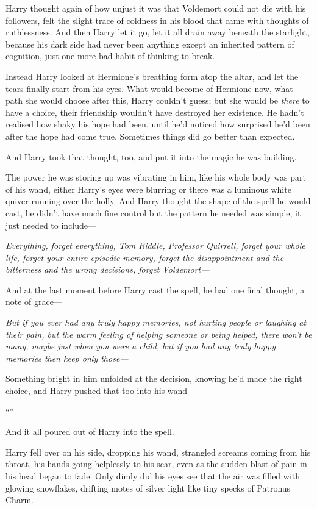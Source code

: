 Harry thought again of how unjust it was that Voldemort could not die with his followers, felt the slight trace of coldness in his blood that came with thoughts of ruthlessness. And then Harry let it go, let it all drain away beneath the starlight, because his dark side had never been anything except an inherited pattern of cognition, just one more bad habit of thinking to break.

Instead Harry looked at Hermione’s breathing form atop the altar, and let the tears finally start from his eyes. What would become of Hermione now, what path she would choose after this, Harry couldn’t guess; but she would be \emph{there} to have a choice, their friendship wouldn’t have destroyed her existence. He hadn’t realised how shaky his hope had been, until he’d noticed how surprised he’d been after the hope had come true. Sometimes things did go better than expected.

And Harry took that thought, too, and put it into the magic he was building.

The power he was storing up was vibrating in him, like his whole body was part of his wand, either Harry’s eyes were blurring or there was a luminous white quiver running over the holly. And Harry thought the shape of the spell he would cast, he didn’t have much fine control but the pattern he needed was simple, it just needed to include—

\emph{Everything, forget everything, Tom Riddle, Professor Quirrell, forget your whole life, forget your entire episodic memory, forget the disappointment and the bitterness and the wrong decisions, forget Voldemort—}

And at the last moment before Harry cast the spell, he had one final thought, a note of grace—

\emph{But if you ever had any truly happy memories, not hurting people or laughing at their pain, but the warm feeling of helping someone or being helped, there won’t be many, maybe just when you were a child, but if you had any truly happy memories then keep only those—}

Something bright in him unfolded at the decision, knowing he’d made the right choice, and Harry pushed that too into his wand—

“\emph{}”

And it all poured out of Harry into the spell.

Harry fell over on his side, dropping his wand, strangled screams coming from his throat, his hands going helplessly to his scar, even as the sudden blast of pain in his head began to fade. Only dimly did his eyes see that the air was filled with glowing snowflakes, drifting motes of silver light like tiny specks of Patronus Charm.

